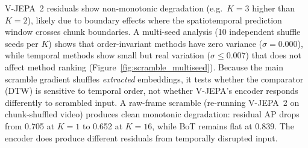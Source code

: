 \documentclass{article}
\theoremstyle{remark}
\begin{document}
\begin{table}[h]
\centering
\caption{AP across scramble levels $K$ on VCDB (527 of 528 videos; one decode failure). $K\!=\!1$ is the unscrambled baseline. Order-invariant methods show constant AP; sequence-aware methods show overall degradation (multi-seed analysis: $\sigma \leq 0.007$; Figure~\ref{fig:scramble_multiseed}).}
\label{tab:scramble_data}
\end{table}

V-JEPA~2 residuals show non-monotonic degradation (e.g.\ $K\!=\!3$ higher than $K\!=\!2$), likely due to boundary effects where the spatiotemporal prediction window crosses chunk boundaries. A multi-seed analysis (10 independent shuffle seeds per $K$) shows that order-invariant methods have zero variance ($\sigma = 0.000$), while temporal methods show small but real variation ($\sigma \leq 0.007$) that does not affect method ranking (Figure~\ref{fig:scramble_multiseed}). Because the main scramble gradient shuffles \emph{extracted} embeddings, it tests whether the comparator (DTW) is sensitive to temporal order, not whether V-JEPA's encoder responds differently to scrambled input. A raw-frame scramble (re-running V-JEPA~2 on chunk-shuffled video) produces clean monotonic degradation: residual AP drops from 0.705 at $K\!=\!1$ to 0.652 at $K\!=\!16$, while BoT remains flat at 0.839. The encoder does produce different residuals from temporally disrupted input.
\end{document}
